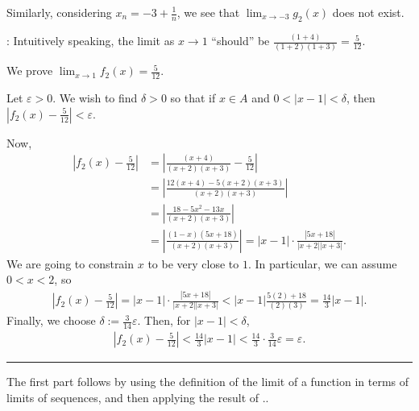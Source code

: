 \documentclass[letterpaper,10pt,english]{jupyterBook}
\begin{document}
\sphinxAtStartPar
Similarly, considering \(x_n=-3 + \frac{1}{n}\),  we see that \(\lim_{x \rightarrow -3}g_{2}(x)\) does not exist.

\sphinxAtStartPar
{}: 
Intuitively speaking, the limit as \(x\rightarrow 1\) “should” be \(\frac{(1 + 4)}{(1 + 2)(1 + 3)}=\frac{5}{12}\).

\sphinxAtStartPar
We prove \(\lim_{x\rightarrow 1}f_2(x) = \frac{5}{12}\).

\sphinxAtStartPar
Let \(\varepsilon>0\). We wish to find \(\delta>0\) so that if \(x\in A\) and \(0<|x-1|<\delta\), then \(\left|f_2(x)-\frac{5}{12}\right| <\varepsilon\).

\sphinxAtStartPar
Now,
\begin{align*}
\left|f_2(x)-\frac{5}{12}\right| &= \left|\frac{(x + 4)}{(x + 2)(x + 3)}-\frac{5}{12}\right| \\
&= \left|\frac{12(x+4)-5(x+2)(x+3)}{(x+2)(x+3)}\right| \\
&= \left|\frac{18-5x^2-13x}{(x+2)(x+3)}\right| \\
&= \left|\frac{(1-x)(5x+18)}{(x+2)(x+3)}\right|  = |x-1|\cdot\frac{|5x+18|}{|x+2||x+3|}.
\end{align*}
\sphinxAtStartPar
We are going to constrain \(x\) to be very close to \(1\). In particular, we can assume \(0<x<2\), so
\begin{equation*}
\begin{split}
\left|f_2(x)-\frac{5}{12}\right| =|x-1|\cdot\frac{|5x+18|}{|x+2||x+3|} < |x-1| \frac{5(2)+18}{(2)(3)} = \frac{14}{3}|x-1|.
\end{split}
\end{equation*}
\sphinxAtStartPar
Finally, we choose \(\delta:= \frac{3}{14}\varepsilon\). Then, for \(|x-1|< \delta\),
\begin{equation*}
\begin{split}
\left|f_2(x)-\frac{5}{12}\right| <  \frac{14}{3}|x-1| <  \frac{14}{3}\cdot \frac{3}{14}\varepsilon = \varepsilon.
\end{split}
\end{equation*}

\bigskip\hrule\bigskip


\sphinxAtStartPar
{\hyperref[\detokenize{Problems:id5}]{}} The first part follows by using the definition of the limit of a function in terms of limits of sequences, and then applying the result of {\hyperref[\detokenize{Problems:p4}]{}}..
\end{document}

